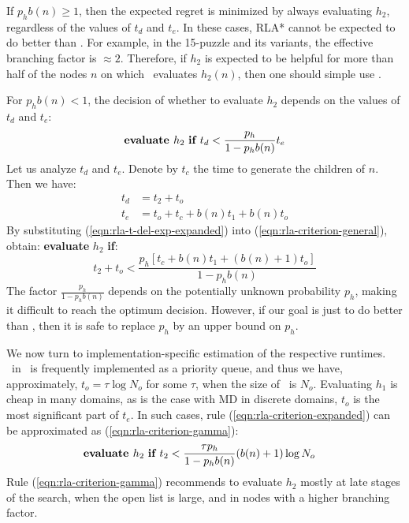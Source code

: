 If $p_h b(n) \ge 1$, then the expected regret is minimized by always
evaluating $h_2$, regardless of the values of $t_d$ and $t_e$.  In
these cases, RLA* cannot be expected to do better than \lazyastar.
For example, in the 15-puzzle and its variants, the effective
branching factor is $\approx 2$. Therefore, if $h_2$ is expected to be
helpful for more than half of the nodes $n$ on which
\lazyastar~evaluates $h_2(n)$, then one should simple use \lazyastar.

For $p_h b(n) < 1$,  the decision of whether to evaluate $h_2$
depends on the values of $t_d$ and $t_e$:
\begin{equation}
\mbox{\bf evaluate }h_2\mbox{ \bf if }t_d<\frac {p_h} {1-p_hb(n)} t_e
\label{eqn:rla-criterion-general}
\end{equation}
Let us analyze $t_d$ and $t_e$. Denote by
$t_c$ the time to generate the children of $n$. Then we have:
\begin{align}
t_d&=t_2+t_o\nonumber\\
t_e&=t_o + t_c+b (n) t_1 + b(n) t_o
\label{eqn:rla-t-del-exp-expanded}
\end{align}
By substituting
(\ref{eqn:rla-t-del-exp-expanded}) into (\ref{eqn:rla-criterion-general}), obtain: {\bf evaluate} $h_2$ {\bf if}:
\begin{equation}
{t_2+t_o}<\frac {p_h \left[{t_c} + b (n)t_1+(b(n)+1){t_o}\right]} {1-p_hb(n)}
\label{eqn:rla-criterion-expanded}
\end{equation}
The factor $\frac {p_h} {1-p_hb(n)}$ depends on the potentially unknown
probability $p_h$, making it difficult to reach the optimum decision.
However, if our goal is just to do better than \lazyastar, then it is safe to replace $p_h$ by an upper bound on $p_h$.

We now turn to implementation-specific estimation of the respective runtimes.
\OPEN~in \astar~is frequently implemented as a priority queue, and thus we have, approximately,
$t_o=\tau \log N_o$ for some $\tau$, when the size of \OPEN~is $N_o$.
Evaluating $h_1$ is cheap in many domains, as is the
case with MD in discrete domains, $t_o$ is the most significant part of
$t_{e}$. In such cases,
rule (\ref{eqn:rla-criterion-expanded}) can be approximated as (\ref{eqn:rla-criterion-gamma}):
\begin{align}
  &\mbox{\bf evaluate }h_2\mbox{ \bf if } t_2 < \frac {\tau p_h} {1-p_hb(n)} (b(n)+1)\log N_o
\label{eqn:rla-criterion-gamma}
\end{align}
Rule (\ref{eqn:rla-criterion-gamma})
recommends to evaluate $h_2$ mostly at late stages of the search,
when the open list is large, and in nodes with a higher branching factor.

